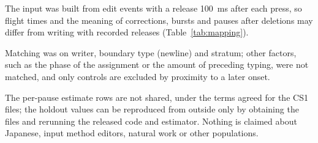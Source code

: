 The input was built from edit events with a release 100~ms after each press, so flight times and the meaning of
corrections, bursts and pauses after deletions may differ from writing with recorded releases
(Table~\ref{tab:mapping}).

Matching was on writer, boundary type (newline) and stratum; other factors, such as the phase of the assignment or the amount of
preceding typing, were not matched, and only controls are excluded by proximity to a later onset.

The per-pause estimate rows are not shared, under the terms agreed for the CS1 files; the holdout values can be
reproduced from outside only by obtaining the files and rerunning the released code and estimator. Nothing is claimed about Japanese, input method editors, natural work or other populations.
